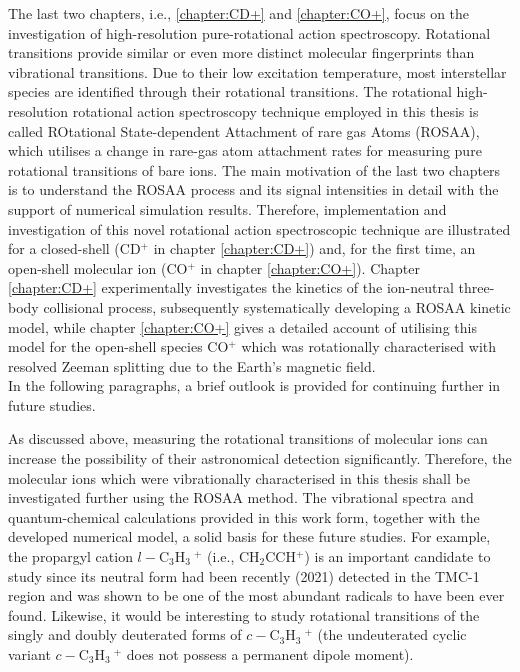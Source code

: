 The last two chapters, i.e., \ref{chapter:CD+} and \ref{chapter:CO+}, focus on the investigation of high-resolution pure-rotational action spectroscopy. Rotational transitions provide similar or even more distinct molecular fingerprints than vibrational transitions. Due to their low excitation temperature, most interstellar species are identified through their rotational transitions. The rotational high-resolution rotational action spectroscopy technique employed in this thesis is called ROtational State-dependent Attachment of rare gas Atoms (ROSAA), which utilises a change in rare-gas atom attachment rates for measuring pure rotational transitions of bare ions. The main motivation of the last two chapters is to understand the ROSAA process and its signal intensities in detail with the support of numerical simulation results. Therefore, implementation and investigation of this novel rotational action spectroscopic technique are illustrated for a closed-shell (CD$^+$ in chapter \ref{chapter:CD+}) and, for the first time, an open-shell molecular ion (CO$^+$ in chapter \ref{chapter:CO+}). Chapter \ref{chapter:CD+} experimentally investigates the kinetics of the ion-neutral three-body collisional process, subsequently systematically developing a ROSAA kinetic model, while chapter \ref{chapter:CO+} gives a detailed account of utilising this model for the open-shell species CO$^+$ which was rotationally characterised with resolved Zeeman splitting due to the Earth's magnetic field.\\


In the following paragraphs, a brief outlook is provided for continuing further in future studies.

As discussed above, measuring the rotational transitions of molecular ions can increase the possibility of their astronomical detection significantly. Therefore, the molecular ions which were vibrationally characterised in this thesis shall be investigated further using the ROSAA method. The vibrational spectra and quantum-chemical calculations provided in this work form, together with the developed numerical model, a solid basis for these future studies. For example, the propargyl cation $l-$C$_3$H$_3\ ^+$ (i.e., CH$_2$CCH$^+$) is an important candidate to study since its neutral form had been recently (2021) detected in the TMC-1 region and was shown to be one of the most abundant radicals to have been ever found. Likewise, it would be interesting to study rotational transitions of the singly and doubly deuterated forms of $c-$C$_3$H$_3\ ^+$ (the undeuterated cyclic variant $c-$C$_3$H$_3\ ^+$ does not possess a permanent dipole moment).

